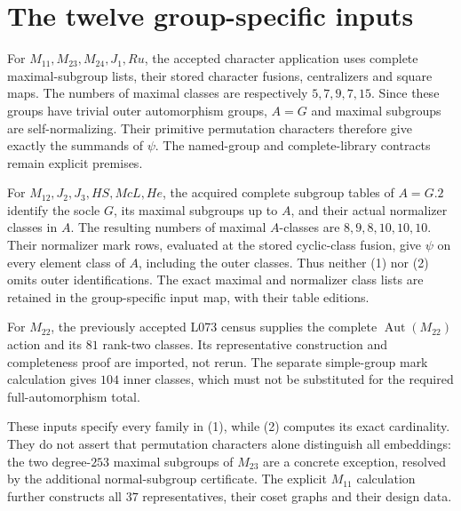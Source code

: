 \documentclass[11pt]{article}
\newcommand{\Aut}{\operatorname{Aut}}
\begin{document}
\section{The twelve group-specific inputs}
For $M_{11},M_{23},M_{24},J_1,Ru$, the accepted character application uses
complete maximal-subgroup lists, their stored character fusions, centralizers
and square maps. The numbers of maximal classes are respectively
$5,7,9,7,15$. Since these groups have trivial outer automorphism groups,
$A=G$ and maximal subgroups are self-normalizing. Their primitive
permutation characters therefore give exactly the summands of $\psi$.
The named-group and complete-library contracts remain explicit premises.

For $M_{12},J_2,J_3,HS,McL,He$, the acquired complete subgroup tables of
$A=G.2$ identify the socle $G$, its maximal subgroups up to $A$, and their
actual normalizer classes in $A$. The resulting numbers of maximal
$A$-classes are $8,9,8,10,10,10$. Their normalizer mark rows, evaluated at
the stored cyclic-class fusion, give $\psi$ on every element class of $A$,
including the outer classes. Thus neither (1) nor (2) omits outer
identifications. The exact maximal and normalizer class lists are retained
in the group-specific input map, with their table editions.

For $M_{22}$, the previously accepted L073 census supplies the complete
$\Aut(M_{22})$ action and its $81$ rank-two classes. Its representative
construction and completeness proof are imported, not rerun. The separate
simple-group mark calculation gives $104$ inner classes, which must not be
substituted for the required full-automorphism total.

These inputs specify every family in (1), while (2) computes its exact
cardinality. They do not assert that permutation characters alone distinguish
all embeddings: the two degree-$253$ maximal subgroups of $M_{23}$ are a
concrete exception, resolved by the additional normal-subgroup certificate.
The explicit $M_{11}$ calculation further constructs all $37$ representatives,
their coset graphs and their design data.
\end{document}
